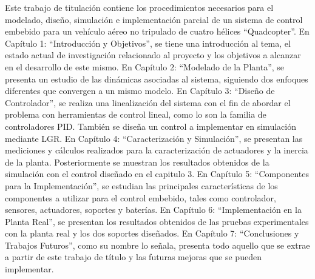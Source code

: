 \documentclass[../main.tex]{subfiles}
\begin{document}
Este trabajo de titulación contiene los procedimientos necesarios para el modelado, diseño, simulación e implementación parcial de un sistema de control embebido para un vehículo aéreo no tripulado de cuatro hélices “Quadcopter”.
\hfill \break
En Capítulo 1: “Introducción y Objetivos”, se tiene una introducción al tema, el estado actual de investigación relacionado al proyecto y los objetivos a alcanzar en el desarrollo de este mismo.
\hfill \break
En Capítulo 2: “Modelado de la Planta”, se presenta un estudio de las dinámicas asociadas al sistema, siguiendo dos enfoques diferentes que convergen a un mismo modelo. 
\hfill \break
En Capítulo 3: “Diseño de Controlador”, se realiza una linealización del sistema con el fin de abordar el problema con herramientas de control lineal, como lo son la familia de controladores PID. También se diseña un control a implementar en simulación mediante LGR.
\hfill \break
En Capítulo 4: “Caracterización y Simulación”, se presentan las mediciones y cálculos realizados para la caracterización de actuadores y la inercia de la planta. Posteriormente se muestran los resultados obtenidos de la simulación con el control diseñado en el capitulo 3.
\hfill \break
En Capítulo 5: “Componentes para la Implementación”, se estudian las principales características de los componentes a utilizar para el control embebido, tales como controlador, sensores, actuadores, soportes y baterías.
\hfill \break
En Capítulo 6: “Implementación en la Planta Real”, se presentan los resultados obtenidos de las pruebas experimentales con la planta real y los dos soportes diseñados. 
\hfill \break
En Capítulo 7: “Conclusiones y Trabajos Futuros”, como su nombre lo señala, presenta todo aquello que se extrae a partir de este trabajo de título y las futuras mejoras que se pueden implementar.
\newpage
	
\end{document}
